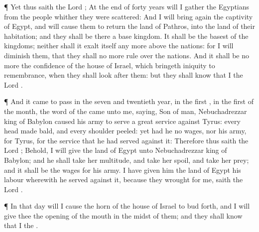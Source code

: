 {\par }{\PP {}¶ Yet thus
saith the
Lord
{}; At the
end of
forty
years will I
gather the
Egyptians from the
people whither they were
scattered:
And I will bring
again the
captivity of
Egypt, and will cause them to
return
{} the
land of
Pathros, into the
land of their
habitation; and they shall be there a
base
kingdom.
It shall be the
basest of the
kingdoms; neither shall it
exalt itself any more above the
nations: for I will
diminish them, that they shall no more
rule over the
nations.
And it shall be no more the
confidence of the
house of
Israel, which
bringeth
{}
iniquity to
remembrance, when they shall
look
after them: but they shall
know that I
{} the
Lord
{}.
\par }{\PP {}¶ And it came to pass in the
seven and
twentieth
year, in the
first
{}, in the
first
{} of the
month, the
word of the
{} came unto me,
saying,
Son of
man,
Nebuchadrezzar
king of
Babylon
caused his
army to
serve a
great
service against
Tyrus: every
head
{} made
bald, and every
shoulder
{}
peeled: yet had he no
wages, nor his
army, for
Tyrus, for the
service that he had
served against it:
Therefore thus
saith the
Lord
{}; Behold, I will
give the
land of
Egypt unto
Nebuchadrezzar
king of
Babylon; and he shall
take her
multitude, and
take her
spoil, and
take her
prey; and it shall be the
wages for his
army.
I have
given him the
land of
Egypt
{} his
labour wherewith he
served against it, because they
wrought for me,
saith the
Lord
{}.
\par }{\PP {}¶ In that
day will I
cause the
horn of the
house of
Israel to bud
forth, and I will
give thee the
opening of the
mouth in the
midst of them; and they shall
know that I
{} the
{}.

}
